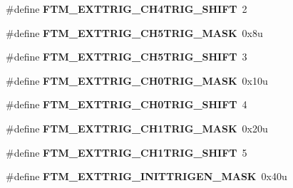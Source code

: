 \begin{DoxyCompactItemize}
\item 
\#define {\bfseries F\+T\+M\+\_\+\+E\+X\+T\+T\+R\+I\+G\+\_\+\+C\+H4\+T\+R\+I\+G\+\_\+\+S\+H\+I\+FT}~2\hypertarget{group__FTM__Register__Masks_ga314862acbbedef36aca6aaccd9b1ff74}{}\label{group__FTM__Register__Masks_ga314862acbbedef36aca6aaccd9b1ff74}

\item 
\#define {\bfseries F\+T\+M\+\_\+\+E\+X\+T\+T\+R\+I\+G\+\_\+\+C\+H5\+T\+R\+I\+G\+\_\+\+M\+A\+SK}~0x8u\hypertarget{group__FTM__Register__Masks_ga26b412d681cbb61d30d2e9d25c906b66}{}\label{group__FTM__Register__Masks_ga26b412d681cbb61d30d2e9d25c906b66}

\item 
\#define {\bfseries F\+T\+M\+\_\+\+E\+X\+T\+T\+R\+I\+G\+\_\+\+C\+H5\+T\+R\+I\+G\+\_\+\+S\+H\+I\+FT}~3\hypertarget{group__FTM__Register__Masks_gadb3658c9b3090cf71c98a986137a0295}{}\label{group__FTM__Register__Masks_gadb3658c9b3090cf71c98a986137a0295}

\item 
\#define {\bfseries F\+T\+M\+\_\+\+E\+X\+T\+T\+R\+I\+G\+\_\+\+C\+H0\+T\+R\+I\+G\+\_\+\+M\+A\+SK}~0x10u\hypertarget{group__FTM__Register__Masks_ga8c677fe12d48d6f0c1b336df2aaff174}{}\label{group__FTM__Register__Masks_ga8c677fe12d48d6f0c1b336df2aaff174}

\item 
\#define {\bfseries F\+T\+M\+\_\+\+E\+X\+T\+T\+R\+I\+G\+\_\+\+C\+H0\+T\+R\+I\+G\+\_\+\+S\+H\+I\+FT}~4\hypertarget{group__FTM__Register__Masks_ga2c365c7c86ae305f243cd065d9bb9202}{}\label{group__FTM__Register__Masks_ga2c365c7c86ae305f243cd065d9bb9202}

\item 
\#define {\bfseries F\+T\+M\+\_\+\+E\+X\+T\+T\+R\+I\+G\+\_\+\+C\+H1\+T\+R\+I\+G\+\_\+\+M\+A\+SK}~0x20u\hypertarget{group__FTM__Register__Masks_ga5a26c6fcf0477c95760e13f68913b5de}{}\label{group__FTM__Register__Masks_ga5a26c6fcf0477c95760e13f68913b5de}

\item 
\#define {\bfseries F\+T\+M\+\_\+\+E\+X\+T\+T\+R\+I\+G\+\_\+\+C\+H1\+T\+R\+I\+G\+\_\+\+S\+H\+I\+FT}~5\hypertarget{group__FTM__Register__Masks_gab622ad237cfc1d00f20b317d23bff1ca}{}\label{group__FTM__Register__Masks_gab622ad237cfc1d00f20b317d23bff1ca}

\item 
\#define {\bfseries F\+T\+M\+\_\+\+E\+X\+T\+T\+R\+I\+G\+\_\+\+I\+N\+I\+T\+T\+R\+I\+G\+E\+N\+\_\+\+M\+A\+SK}~0x40u\hypertarget{group__FTM__Register__Masks_ga71d3ac60b3056f50c6d22c8e3b2701bb}{}\label{group__FTM__Register__Masks_ga71d3ac60b3056f50c6d22c8e3b2701bb}


\end{DoxyCompactItemize}
